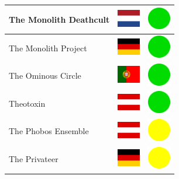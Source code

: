 \documentclass[12pt, a4paper, twoside]{report}
\begin{document}
\begin{center}
\begin{longtable}{|p{5cm}|p{2cm}|p{2cm}|}
 The Monolith Deathcult                                     & \includegraphics[width=1cm]{../4x3/nl} &   \includegraphics[width=1cm]{../likes/y} \\ \hline
 The Monolith Project                                       & \includegraphics[width=1cm]{../4x3/de} &   \includegraphics[width=1cm]{../likes/y} \\ \hline
 The Ominous Circle                                         & \includegraphics[width=1cm]{../4x3/pt} &   \includegraphics[width=1cm]{../likes/y} \\ \hline
 Theotoxin                                                  & \includegraphics[width=1cm]{../4x3/at} &   \includegraphics[width=1cm]{../likes/y} \\ \hline
 The Phobos Ensemble                                        & \includegraphics[width=1cm]{../4x3/at} &   \includegraphics[width=1cm]{../likes/m} \\ \hline
 The Privateer                                              & \includegraphics[width=1cm]{../4x3/de} &   \includegraphics[width=1cm]{../likes/m} \\ \hline

\end{longtable}
\end{center}
\end{document}
